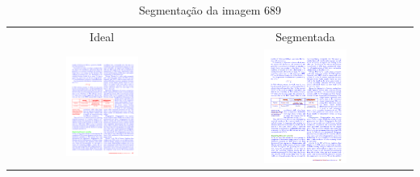 \documentclass[a4paper,11pt]{article}
\begin{document}
    \begin{table}[p]
      \caption{Segmentação da imagem 689}
      \begin{center}
        \begin{tabular}{ c c }
          Ideal & Segmentada \\
          \includegraphics[width=0.4\textwidth]{assets/final_ideal/cacm_689_ideal.png}
          &
          \includegraphics[width=0.4\textwidth]{assets/result_imagens/cacm_50_percent_sparse_9x9_689_final.png}
        \end{tabular}
      \end{center}
      \label{tab:segmentation_689}
    \end{table}
\end{document}
